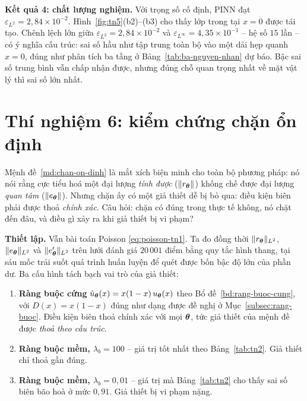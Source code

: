 \textbf{Kết quả 4: chất lượng nghiệm.} Với trọng số cố định, PINN đạt
$\varepsilon_{L^2} = 2{,}84\times10^{-2}$.
Hình~\ref{fig:tn5}(b2)--(b3) cho thấy lớp trong tại $x = 0$ được tái tạo. Chênh
lệch lớn giữa $\varepsilon_{L^2} = 2{,}84\times10^{-2}$ và
$\varepsilon_{L^{\infty}} = 4{,}35\times10^{-1}$ -- hệ số $15$ lần -- có ý nghĩa
cấu trúc: sai số hầu như tập trung toàn bộ vào một dải hẹp quanh $x = 0$, đúng như
phân tích ba tầng ở Bảng~\ref{tab:ba-nguyen-nhan} dự báo. Bậc sai số trung bình
vẫn chấp nhận được, nhưng đúng chỗ quan trọng nhất về mặt vật lý thì sai số lớn
nhất.
 
\section{Thí nghiệm 6: kiểm chứng chặn ổn định}
\label{sec:tn6}

\begin{thinghiem}
\label{tn:chan}
Mệnh đề~\ref{md:chan-on-dinh} là mắt xích biện minh cho toàn bộ phương pháp: nó
nói rằng cực tiểu hoá một đại lượng \emph{tính được} ($\lVert r_{\bm{\theta}}\rVert$) khống
chế được đại lượng \emph{quan tâm} ($\lVert e_{\bm{\theta}}\rVert$). Nhưng chặn ấy có một
giả thiết dễ bị bỏ qua: điều kiện biên phải được thoả \emph{chính xác}. Câu hỏi:
chặn có đúng trong thực tế không, nó chặt đến đâu, và điều gì xảy ra khi giả
thiết bị vi phạm?
\end{thinghiem}

\textbf{Thiết lập.} Vẫn bài toán Poisson \eqref{eq:poisson-tn1}. Ta đo đồng thời
$\lVert r_{\bm{\theta}}\rVert_{L^2}$, $\lVert e_{\bm{\theta}}\rVert_{L^2}$ và
$\lVert e_{\bm{\theta}}'\rVert_{L^2}$ trên lưới đánh giá $20\,001$ điểm bằng quy tắc hình
thang, tại sáu mốc trải suốt quá trình huấn luyện để quét được bốn bậc độ lớn
của phần dư. Ba cấu hình tách bạch vai trò của giả thiết:

\begin{enumerate}[label=(\alph*),leftmargin=2.2em,itemsep=2pt]
\item \textbf{Ràng buộc cứng} $\hat u_{\bm{\theta}}(x) = x(1-x)\,u_{\bm{\theta}}(x)$ theo
Bổ đề~\ref{bd:rang-buoc-cung}, với $D(x) = x(1-x)$ đúng như dạng được đề nghị ở
Mục~\ref{subsec:rang-buoc}. Điều kiện biên thoả chính xác với mọi $\bm{\theta}$, tức
giả thiết của mệnh đề được \emph{thoả theo cấu trúc}.
\item \textbf{Ràng buộc mềm, $\lambda_b = 100$} -- giá trị tốt nhất theo
Bảng~\ref{tab:tn2}. Giả thiết chỉ thoả gần đúng.
\item \textbf{Ràng buộc mềm, $\lambda_b = 0{,}01$} -- giá trị mà
Bảng~\ref{tab:tn2} cho thấy sai số biên bão hoà ở mức $0{,}91$. Giả thiết bị vi
phạm nặng.
\end{enumerate}

